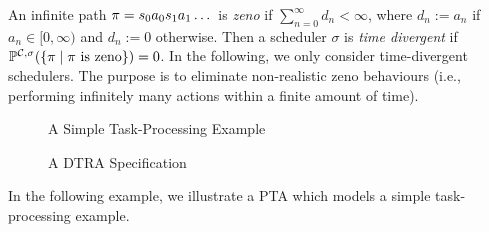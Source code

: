 \smallskip {}
An infinite path $\pi=s_0a_0s_1a_1\dots$ is \emph{zeno} if $\sum_{n=0}^\infty d_n<\infty$, where $d_n:=a_n$ if $a_n\in [0,\infty)$ and $d_n:=0$ otherwise.
Then a scheduler $\sigma$ is \emph{time divergent} if $\mathbb{P}^{\mathcal{C},\sigma}(\{\pi\mid\pi\mbox{ is zeno}\})=0$.
In the following, we only consider time-divergent schedulers.
The purpose is to eliminate non-realistic zeno behaviours (i.e., performing infinitely many actions within a finite amount of time).
\vspace{-3em}
\begin{figure}[]
    \centering
    \begin{minipage}[t]{0.5\linewidth}  
        \centering  
        \resizebox{1\textwidth}{!}{
            
        }
        \caption{A Simple Task-Processing Example}
        \label{fig:pta}
    \end{minipage}
    \begin{minipage}[t]{0.45\linewidth}  
        \centering
        \resizebox{1\textwidth}{!}{
            
            }
        \caption{A DTRA Specification}
        \label{fig:dta}
    \end{minipage}
\end{figure}  

%         

In the following example, we illustrate a PTA which models a simple task-processing example.

